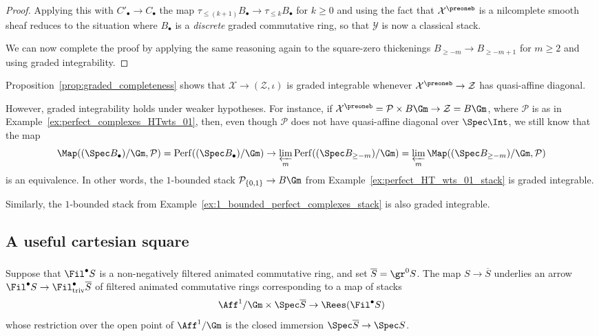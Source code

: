 \documentclass[10pt]{amsart}
\begin{document}
\begin{proof}
Applying this with $C'_\bullet \to C_\bullet$ the map $\tau_{\leq (k+1)}B_\bullet\to \tau_{\leq k}B_\bullet$ for $k\ge 0$ and using the fact that $\mathcal{X}^\preoneb$ is a nilcomplete smooth sheaf reduces to the situation where $B_\bullet$ is a \emph{discrete} graded commutative ring, so that $\mathcal{Y}$ is now a classical stack. 

We can now complete the proof by applying the same reasoning again to the square-zero thickenings $B_{\ge -m}\to B_{\ge -m+1}$ for $m\ge 2$ and using graded integrability.
\end{proof}

\begin{remark}
\label{rem:use_of_graded_completeness}
Proposition~\ref{prop:graded_completeness} shows that $\mathcal{X}\to (\mathcal{Z},\iota)$ is graded integrable whenever $\mathcal{X}^\preoneb\to \mathcal{Z}$ has quasi-affine diagonal. 

However, graded integrability holds under weaker hypotheses. For instance, if $\mathcal{X}^\preoneb = \mathcal{P}\times B\Gm\to \mathcal{Z} = B\Gm$, where $\mathcal{P}$ is as in Example~\ref{ex:perfect_complexes_HTwts_01}, then, even though $\mathcal{P}$ does not have quasi-affine diagonal over $\Spec \Int$, we still know that the map
\[
\Map((\Spec B_\bullet)/\Gm,\mathcal{P}) = \mathrm{Perf}((\Spec B_\bullet)/\Gm)\to \varprojlim_m \mathrm{Perf}((\Spec B_{\ge -m})/\Gm) = \varprojlim_m\Map((\Spec B_{\ge -m})/\Gm,\mathcal{P}) 
\]
is an equivalence. In other words, the $1$-bounded stack $\mathcal{P}_{\{0,1\}}\to B\Gm$ from Example~\ref{ex:perfect_HT_wts_01_stack} is graded integrable.

Similarly, the $1$-bounded stack from Example~\ref{ex:1_bounded_perfect_complexes_stack} is also graded integrable.
\end{remark}   


\subsection{A useful cartesian square}

\subsubsection{}
Suppose that $\Fil^\bullet S$ is a non-negatively filtered animated commutative ring, and set $\overline{S} = \gr^0S$. The map $S\to \overline{S}$ underlies an arrow $\Fil^\bullet S \to \Fil^\bullet_{\mathrm{triv}}\overline{S}$ of filtered animated commutative rings corresponding to a map of stacks
\[
\Aff^1/\Gm\times \Spec \overline{S}\to \Rees(\Fil^\bullet S)
\]
whose restriction over the open point of $\Aff^1/\Gm$ is the closed immersion $\Spec \overline{S}\to \Spec S$. 
\end{document}
